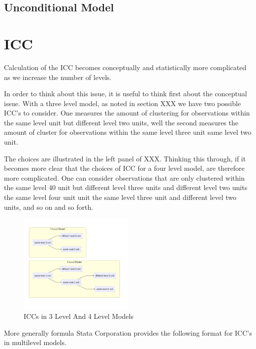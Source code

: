 \documentclass[
  letterpaper,
  DIV=11,
  numbers=noendperiod]{scrreprt}
\begin{document}
\subsection{Unconditional Model}\label{unconditional-model-2}

\section{ICC}\label{icc}

Calculation of the ICC becomes conceptually and statistically more
complicated as we increase the number of levels.

In order to think about this issue, it is useful to think first about
the conceptual issue. With a three level model, as noted in section XXX
we have two possible ICC's to consider. One measures the amount of
clustering for observations within the same level unit but different
level two units, well the second measures the amount of cluster for
observations within the same level three unit same level two unit.

The choices are illustrated in the left panel of XXX. Thinking this
through, if it becomes more clear that the choices of ICC for a four
level model, are therefore more complicated. One can consider
observations that are only clustered within the same level 40 unit but
different level three units and different level two units the same level
four unit unit the same level three unit and different level two units,
and so on and so forth.

\begin{figure}[H]

{\centering \includegraphics[width=0.5\textwidth,height=\textheight]{ICC.png}

}

\caption{ICCs in 3 Level And 4 Level Models}

\end{figure}%

More generally formula Stata Corporation provides the following format
for ICC's in multilevel models.
\end{document}
